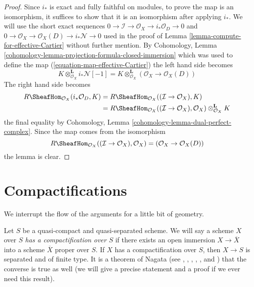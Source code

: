 \begin{proof}
Since $i_*$ is exact and fully faithful on modules, to prove the map is an
isomorphism, it suffices to show that it is an isomorphism after applying
$i_*$. We will use the short exact sequences
$0 \to \mathcal{I} \to \mathcal{O}_X \to i_*\mathcal{O}_D \to 0$
and
$0 \to \mathcal{O}_X \to \mathcal{O}_X(D) \to i_*\mathcal{N} \to 0$
used in the proof of Lemma \ref{lemma-compute-for-effective-Cartier}
without further mention. By
Cohomology, Lemma \ref{cohomology-lemma-projection-formula-closed-immersion}
which was used to define the map (\ref{equation-map-effective-Cartier})
the left hand side becomes
$$
K \otimes_{\mathcal{O}_X}^\mathbf{L} i_*\mathcal{N}[-1] =
K \otimes_{\mathcal{O}_X}^\mathbf{L} (\mathcal{O}_X \to \mathcal{O}_X(D))
$$
The right hand side becomes
\begin{align*}
R\SheafHom_{\mathcal{O}_X}(i_*\mathcal{O}_D, K) & =
R\SheafHom_{\mathcal{O}_X}((\mathcal{I} \to \mathcal{O}_X), K) \\
& =
R\SheafHom_{\mathcal{O}_X}((\mathcal{I} \to \mathcal{O}_X), \mathcal{O}_X)
\otimes_{\mathcal{O}_X}^\mathbf{L} K
\end{align*}
the final equality by
Cohomology, Lemma \ref{cohomology-lemma-dual-perfect-complex}.
Since the map comes from the isomorphism
$$
R\SheafHom_{\mathcal{O}_X}((\mathcal{I} \to \mathcal{O}_X), \mathcal{O}_X)
= (\mathcal{O}_X \to \mathcal{O}_X(D))
$$
the lemma is clear.
\end{proof}







\section{Compactifications}
\label{section-compactify}

\noindent
We interrupt the flow of the arguments for a little bit of geometry.

\medskip\noindent
Let $S$ be a quasi-compact and quasi-separated scheme. We will say a
scheme $X$ over $S$ {\it has a compactification over $S$} if there exists
an open immersion $X \to \overline{X}$ into a scheme $\overline{X}$
proper over $S$. If $X$ has a compactification over $S$, then $X \to S$
is separated and of finite type. It is a theorem of Nagata (see
\cite{Lutkebohmert}, \cite{Conrad-Nagata}, \cite{Nagata-1},
\cite{Nagata-2}, \cite{Nagata-3}, and \cite{Nagata-4}) that the converse is
true as well (we will give a
precise statement and a proof if we ever need this result).

